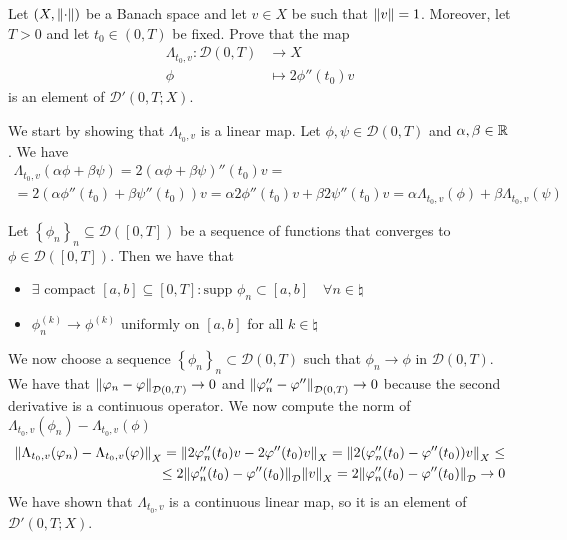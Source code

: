 \newpage
\begin{exercise}
    Let \((X, \norm{\cdot})\) be a Banach space and let \(v \in X\) be such that \(\norm{v} = 1\). Moreover, let \(T > 0\) and let \(t_0 \in (0, T)\) be fixed. Prove that the map
    \begin{align*}
        \Lambda_{t_0, v}: \mathcal{D}(0, T) &\longrightarrow X \\
        \phi &\longmapsto 2 \phi''(t_0) v
    \end{align*}
    is an element of \(\mathcal{D}'(0, T; X)\).
\end{exercise}
We start by showing that \(\Lambda_{t_0, v}\) is a linear map. Let \(\phi, \psi \in \mathcal{D}(0, T)\) and \(\alpha, \beta \in \mathbb{R}\). We have
\[
    \begin{split}
        \Lambda_{t_0, v}(\alpha \phi + \beta \psi) = 2 (\alpha \phi + \beta \psi)''(t_0) v =\\
        = 2 (\alpha \phi''(t_0) + \beta \psi''(t_0)) v = \alpha 2 \phi''(t_0) v + \beta 2 \psi''(t_0) v = \alpha \Lambda_{t_0, v}(\phi) + \beta \Lambda_{t_0, v}(\psi)
    \end{split}
\]
\begin{remark}
    Let \(\left\{ \phi_n \right\}_{n} \subseteq \mathcal{D}([0, T])\) be a sequence of functions that converges to \(\phi \in \mathcal{D}([0, T])\). Then we have that
    \begin{itemize}
        \item \(\exists \text{ compact }[a, b] \subseteq [0, T] \colon \text{supp } \phi_n \subset [a, b] \quad \forall n \in \natural\)
        \item \(\phi_n^{(k)} \to \phi^{(k)}\) uniformly on \([a, b]\) for all \(k \in \natural\)
    \end{itemize}
\end{remark}
We now choose a sequence \(\left\{\phi_n\right\}_n \subset \mathcal{D}(0, T)\) such that \(\phi_n \to \phi\) in \(\mathcal{D}(0, T)\). We have that \(\norm{\varphi_n - \varphi}_{\mathcal{D}(0, T)} \to 0\) and \(\norm{\varphi_n'' - \varphi''}_{\mathcal{D}(0, T)} \to 0\) because the second derivative is a continuous operator. We now compute the norm of \(\Lambda_{t_0, v}(\phi_n) - \Lambda_{t_0, v}(\phi)\)
\[
    \begin{split}
        \norm{\Lambda_{t_0, v}(\varphi_n) - \Lambda_{t_0, v}(\varphi)}_X = \norm{2 \varphi_n''(t_0) v - 2 \varphi''(t_0) v}_X = \norm{2 (\varphi_n''(t_0) - \varphi''(t_0)) v}_X \leq \\
        \leq 2 \norm{\varphi_n''(t_0) - \varphi''(t_0)}_\mathcal{D} \norm{v}_X = 2 \norm{\varphi_n''(t_0) - \varphi''(t_0)}_\mathcal{D} \to 0
    \end{split} 
\]
We have shown that \(\Lambda_{t_0, v}\) is a continuous linear map, so it is an element of \(\mathcal{D}'(0, T; X)\).

    